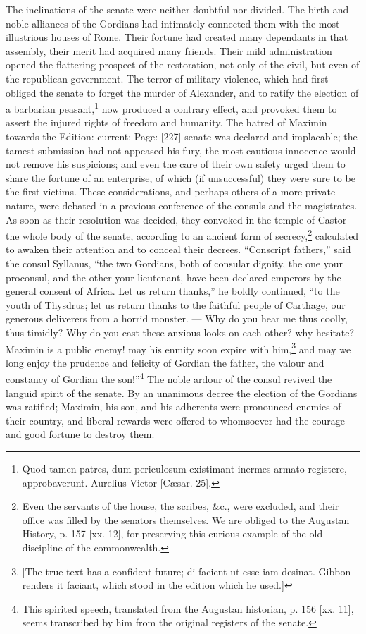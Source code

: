 The inclinations of the senate were neither doubtful nor divided. The birth and noble alliances of the Gordians had intimately connected them with the most illustrious houses of Rome. Their fortune had created many dependants in that assembly, their merit had acquired many friends. Their mild administration opened the flattering prospect of the restoration, not only of the civil, but even of the republican government. The terror of military violence, which had first obliged the senate to forget the murder of Alexander, and to ratify the election of a barbarian peasant,\footnote{Quod tamen patres, dum periculosum existimant inermes armato registere, approbaverunt. Aurelius Victor [Cæsar. 25].} now produced a contrary effect, and provoked them to assert the injured rights of freedom and humanity. The hatred of Maximin towards the Edition: current; Page: [227] senate was declared and implacable; the tamest submission had not appeased his fury, the most cautious innocence would not remove his suspicions; and even the care of their own safety urged them to share the fortune of an enterprise, of which (if unsuccessful) they were sure to be the first victims. These considerations, and perhaps others of a more private nature, were debated in a previous conference of the consuls and the magistrates. As soon as their resolution was decided, they convoked in the temple of Castor the whole body of the senate, according to an ancient form of secrecy,\footnote{Even the servants of the house, the scribes, \&c., were excluded, and their office was filled by the senators themselves. We are obliged to the Augustan History, p. 157 [xx. 12], for preserving this curious example of the old discipline of the commonwealth.} calculated to awaken their attention and to conceal their decrees. \texthebrew{“}Conscript fathers,\texthebrew{}” said the consul Syllanus, \texthebrew{“}the two Gordians, both of consular dignity, the one your proconsul, and the other your lieutenant, have been declared emperors by the general consent of Africa. Let us return thanks,\texthebrew{}” he boldly continued, \texthebrew{“}to the youth of Thysdrus; let us return thanks to the faithful people of Carthage, our generous deliverers from a horrid monster. \texthebrew{—} Why do you hear me thus coolly, thus timidly? Why do you cast these anxious looks on each other? why hesitate? Maximin is a public enemy! may his enmity soon expire with him,\footnote{[The true text has a confident future; di facient ut esse iam desinat. Gibbon renders it faciant, which stood in the edition which he used.]} and may we long enjoy the prudence and felicity of Gordian the father, the valour and constancy of Gordian the son!\texthebrew{}”\footnote{This spirited speech, translated from the Augustan historian, p. 156 [xx. 11], seems transcribed by him from the original registers of the senate.} The noble ardour of the consul revived the languid spirit of the senate. By an unanimous decree the election of the Gordians was ratified; Maximin, his son, and his adherents were pronounced enemies of their country, and liberal rewards were offered to whomsoever had the courage and good fortune to destroy them.

